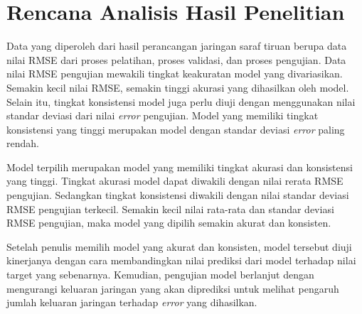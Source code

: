 \section{Rencana Analisis Hasil Penelitian}
Data yang diperoleh dari hasil perancangan jaringan saraf tiruan berupa data nilai RMSE dari proses pelatihan, proses validasi, dan proses pengujian. Data nilai RMSE pengujian mewakili tingkat keakuratan model yang divariasikan. Semakin kecil nilai RMSE, semakin tinggi akurasi yang dihasilkan oleh model. Selain itu, tingkat konsistensi model juga perlu diuji dengan menggunakan nilai standar deviasi dari nilai \textit{error} pengujian. Model yang memiliki tingkat konsistensi yang tinggi merupakan model dengan standar deviasi \textit{error} paling rendah.

Model terpilih merupakan model yang memiliki tingkat akurasi dan konsistensi yang tinggi. Tingkat akurasi model dapat diwakili dengan nilai rerata RMSE pengujian. Sedangkan tingkat konsistensi diwakili dengan nilai standar deviasi RMSE pengujian terkecil. Semakin kecil nilai rata-rata dan standar deviasi RMSE pengujian, maka model yang dipilih semakin akurat dan konsisten.

Setelah penulis memilih model yang akurat dan konsisten, model tersebut diuji kinerjanya dengan cara membandingkan nilai prediksi dari model terhadap nilai target yang sebenarnya. Kemudian, pengujian model berlanjut dengan mengurangi keluaran jaringan yang akan diprediksi untuk melihat pengaruh jumlah keluaran jaringan terhadap \textit{error} yang dihasilkan.